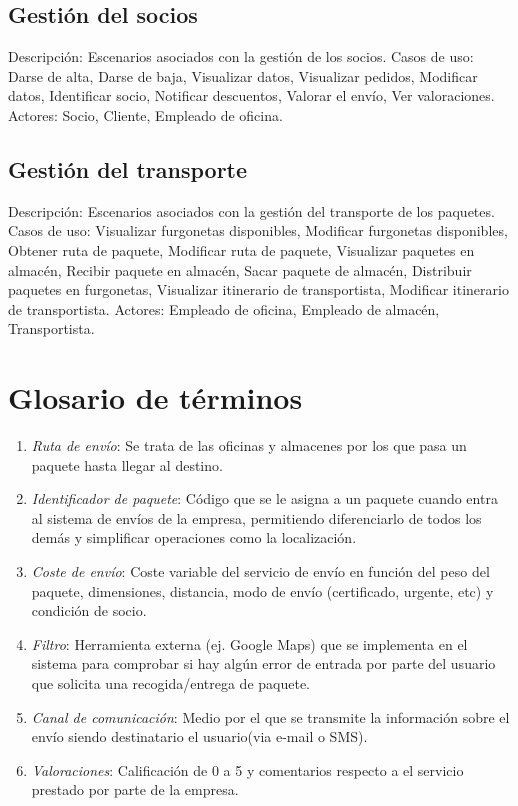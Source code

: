 \subsection{Gestión del socios}	
Descripción:
Escenarios asociados con la gestión de los socios.
Casos de uso:
 Darse de alta, Darse de baja, Visualizar datos, Visualizar pedidos, Modificar datos, Identificar socio, Notificar descuentos, Valorar el envío, Ver valoraciones.
Actores:
Socio, Cliente, Empleado de oficina.
\subsection{Gestión del transporte}	
Descripción:
Escenarios asociados con la gestión del transporte de los paquetes.
Casos de uso:
Visualizar furgonetas disponibles, Modificar furgonetas disponibles, Obtener ruta de paquete, Modificar ruta de paquete, Visualizar paquetes en almacén, Recibir paquete en almacén, Sacar paquete de almacén, Distribuir paquetes en furgonetas, Visualizar itinerario de transportista, Modificar itinerario de transportista.
Actores:
Empleado de oficina, Empleado de almacén, Transportista.

\newpage

\section{Glosario de términos}
	\begin{enumerate}
		\item \textit{Ruta de envío}: Se trata de las oficinas y almacenes por los que pasa un paquete hasta llegar al destino.
		\item \textit{Identificador de paquete}: Código que se le asigna a un paquete cuando entra al sistema de envíos de la empresa, permitiendo diferenciarlo de todos los demás y simplificar operaciones como la localización.
		\item \textit{Coste de envío}: Coste variable del servicio de envío en función del peso del paquete, dimensiones, distancia, modo de envío (certificado, urgente, etc) y condición de socio.
		\item \textit{Filtro}: Herramienta externa (ej. Google Maps) que se implementa  en el sistema para comprobar si hay algún error de entrada por parte del usuario que solicita una recogida/entrega de paquete.
		\item \textit{Canal de comunicación}: Medio por el que se transmite la información sobre el envío siendo destinatario el usuario(via e-mail o SMS).
		\item \textit{Valoraciones}: Calificación de 0 a 5 y comentarios respecto a el servicio prestado por parte de la empresa.
		
 	\end{enumerate}
\newpage


